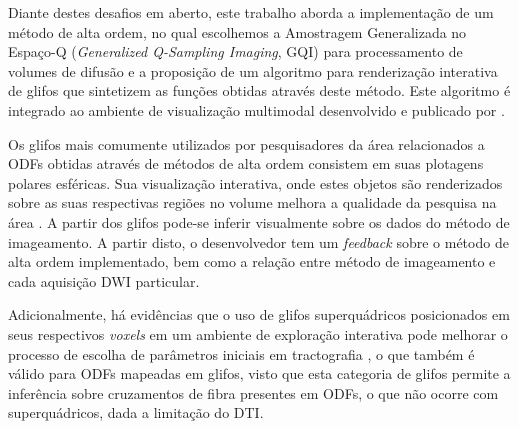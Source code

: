 \documentclass[
    12pt,                %
    oneside,            %
    a4paper,            %
    english,            %
    french,                %
    spanish,            %
    brazil                %
    ]{abntex2}
\begin{document}
Diante destes desafios em aberto, este trabalho aborda a implementação de um método de alta ordem, no qual escolhemos a Amostragem Generalizada no Espaço-Q (\textit{Generalized Q-Sampling Imaging}, GQI) para processamento de volumes de difusão e a proposição de um algoritmo para renderização interativa de glifos que sintetizem as funções obtidas através deste método. Este algoritmo é integrado ao ambiente de visualização multimodal desenvolvido e publicado por .

Os glifos mais comumente utilizados por pesquisadores da área relacionados a ODFs obtidas através de métodos de alta ordem consistem em suas plotagens polares esféricas. Sua visualização interativa, onde estes objetos são renderizados sobre as suas respectivas regiões no volume melhora a qualidade da pesquisa na área \cite{peeters2009}. A partir dos glifos pode-se inferir visualmente sobre os dados do método de imageamento. A partir disto, o desenvolvedor tem um \textit{feedback} sobre o método de alta ordem implementado, bem como a relação entre método de imageamento e cada aquisição DWI particular.

Adicionalmente, há evidências que o uso de glifos superquádricos posicionados em seus respectivos \textit{voxels} em um ambiente de exploração interativa pode melhorar o processo de escolha de parâmetros iniciais em tractografia \cite{voltoline2021}, o que também é válido para ODFs mapeadas em glifos, visto que esta categoria de glifos permite a inferência sobre cruzamentos de fibra presentes em ODFs, o que não ocorre com superquádricos, dada a limitação do DTI.




\end{document}
